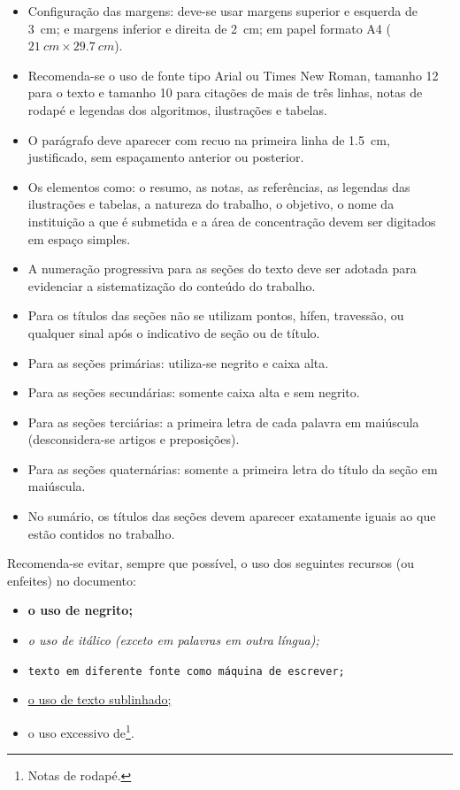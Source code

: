 \begin{itemize}%
\item Configuração das margens: deve-se usar margens superior e esquerda de \SI{3}{cm}; e margens inferior e direita de \SI{2}{cm}; em papel formato A4 ($\SI{21}{cm} \times \SI{29,7}{cm}$).
\item Recomenda-se o uso de fonte tipo Arial ou Times New Roman, tamanho 12 para o texto e tamanho 10 para citações de mais de três linhas, notas de rodapé e legendas dos algoritmos, ilustrações e tabelas.
\item O parágrafo deve aparecer com recuo na primeira linha de \SI{1,5}{cm}, justificado, sem espaçamento anterior ou posterior.
\item Os elementos como: o resumo, as notas, as referências, as legendas das ilustrações e tabelas, a natureza do trabalho, o objetivo, o nome da instituição a que é submetida e a área de concentração devem ser digitados em espaço simples.
\item A numeração progressiva para as seções do texto deve ser adotada para evidenciar a sistematização do conteúdo do trabalho.
\item Para os títulos das seções não se utilizam pontos, hífen, travessão, ou qualquer sinal após o indicativo de seção ou de título.
\item Para as seções primárias: utiliza-se negrito e caixa alta.
\item Para as seções secundárias: somente caixa alta e sem negrito.
\item Para as seções terciárias: a primeira letra de cada palavra em maiúscula (desconsidera-se artigos e preposições).
\item Para as seções quaternárias: somente a primeira letra do título da seção em maiúscula.
\item No sumário, os títulos das seções devem aparecer exatamente iguais ao que estão contidos no trabalho.
\end{itemize}

Recomenda-se evitar, sempre que possível, o uso dos seguintes recursos (ou enfeites) no documento:

\begin{itemize}%
\item \textbf{o uso de negrito;}
\item \textit{o uso de itálico (exceto em palavras em outra língua);}
\item \texttt{texto em diferente fonte como máquina de escrever;}
\item \underline{o uso de texto sublinhado;}
\item o uso excessivo de\footnote{Notas de rodapé.}.
\end{itemize}

